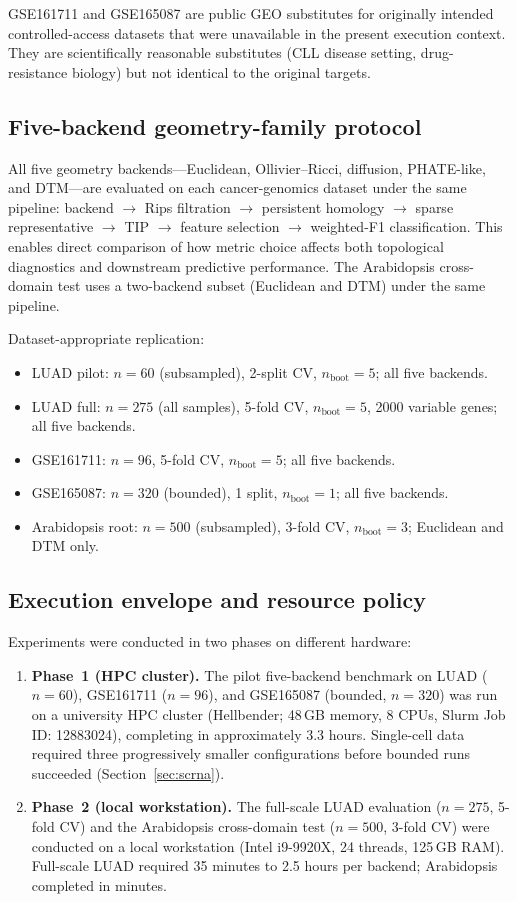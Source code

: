 \documentclass[11pt]{article}
\begin{document}
GSE161711 and GSE165087 are public GEO substitutes for originally intended controlled-access datasets that were unavailable in the present execution context.
They are scientifically reasonable substitutes (CLL disease setting, drug-resistance biology) but not identical to the original targets.

\subsection{Five-backend geometry-family protocol}

All five geometry backends---Euclidean, Ollivier--Ricci, diffusion, PHATE-like, and DTM---are evaluated on each cancer-genomics dataset under the same pipeline: backend $\to$ Rips filtration $\to$ persistent homology $\to$ sparse representative $\to$ TIP $\to$ feature selection $\to$ weighted-F1 classification.
This enables direct comparison of how metric choice affects both topological diagnostics and downstream predictive performance.
The Arabidopsis cross-domain test uses a two-backend subset (Euclidean and DTM) under the same pipeline.

Dataset-appropriate replication:
\begin{itemize}[leftmargin=1.5em]
\item LUAD pilot: $n = 60$ (subsampled), 2-split CV, $n_{\text{boot}} = 5$; all five backends.
\item LUAD full: $n = 275$ (all samples), 5-fold CV, $n_{\text{boot}} = 5$, 2000 variable genes; all five backends.
\item GSE161711: $n = 96$, 5-fold CV, $n_{\text{boot}} = 5$; all five backends.
\item GSE165087: $n = 320$ (bounded), 1 split, $n_{\text{boot}} = 1$; all five backends.
\item Arabidopsis root: $n = 500$ (subsampled), 3-fold CV, $n_{\text{boot}} = 3$; Euclidean and DTM only.
\end{itemize}

\subsection{Execution envelope and resource policy}

Experiments were conducted in two phases on different hardware:
\begin{enumerate}[leftmargin=1.5em]
\item \textbf{Phase~1 (HPC cluster).} The pilot five-backend benchmark on LUAD ($n = 60$), GSE161711 ($n = 96$), and GSE165087 (bounded, $n = 320$) was run on a university HPC cluster (Hellbender; 48\,GB memory, 8 CPUs, Slurm Job ID: 12883024), completing in approximately 3.3 hours.
Single-cell data required three progressively smaller configurations before bounded runs succeeded (Section~\ref{sec:scrna}).
\item \textbf{Phase~2 (local workstation).} The full-scale LUAD evaluation ($n = 275$, 5-fold CV) and the Arabidopsis cross-domain test ($n = 500$, 3-fold CV) were conducted on a local workstation (Intel i9-9920X, 24 threads, 125\,GB RAM).
Full-scale LUAD required 35 minutes to 2.5 hours per backend; Arabidopsis completed in minutes.
\end{enumerate}
\end{document}
